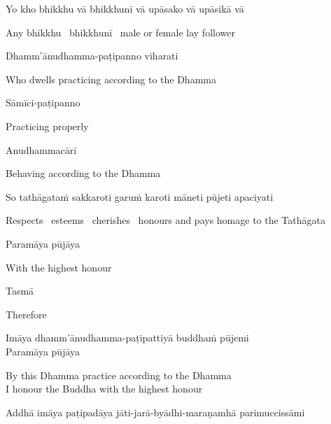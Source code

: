 
Yo kho bhikkhu vā bhikkhunī vā upāsako vā upāsikā vā

\begin{english}
  Any bhikkhu \breathmark\ bhikkhunī \breathmark\ male or female lay follower
\end{english}

\ifbsixversion\clearpage\fi

Dhamm'ānudhamma-paṭipanno viharati

\begin{english}
  Who dwells practicing according to the Dhamma
\end{english}

Sāmīci-paṭipanno

\begin{english}
  Practicing properly
\end{english}

Anudhammacārī

\begin{english}
  Behaving according to the Dhamma
\end{english}

So tathāgataṁ sakkaroti garuṁ karoti māneti pūjeti apaciyati

\begin{english-hang}
  Respects \breathmark\ esteems \breathmark\ cherishes \breathmark\ honours and pays homage to the Tathāgata
\end{english-hang}

Paramāya pūjāya

\begin{english}
  With the highest honour
\end{english}

\suttaRef{[DN 16]}

Tasmā

\begin{english}
  Therefore
\end{english}

Imāya dhamm'ānudhamma-paṭipattiyā buddhaṁ pūjemi\\
Paramāya pūjāya

\begin{english}
  By this Dhamma practice according to the Dhamma\\
  I honour the Buddha with the highest honour
\end{english}

\begin{pali-hang}
  Addhā imāya paṭipadāya jāti-jarā-byādhi-maraṇamhā parimuccissāmi
\end{pali-hang}

